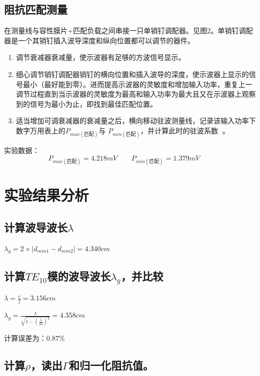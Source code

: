\documentclass{../source/Experiment}
\begin{document}
        \subsection{阻抗匹配测量}
        在测量线与容性膜片+匹配负载之间串接一只单销钉调配器。见图2。单销钉调配器是一个其销钉插入波导深度和纵向位置都可以调节的器件。
        \begin{enumerate}
            \item 调节衰减器衰减量，使示波器有足够的方波信号显示。
            \item 细心调节销钉调配器销钉的横向位置和插入波导的深度，使示波器上显示的信号最小（最好能到零）。进而提高示波器的灵敏度和增加输入功率，重复上一调节过程直到当示波器的灵敏度为最高和输入功率为最大且又在示波器上观察到的信号为最小为止，即找到最佳匹配位置。
            \item 适当增加可调衰减器的衰减量之后，横向移动驻波测量线，记录该输入功率下数字万用表上的$P_{max(\mbox{匹配})}$与 $P_{min(\mbox{匹配})}$，并计算此时的驻波系数 。
        \end{enumerate}
        实验数据：$$P_{max(\mbox{匹配})} = 4.218mV\qquad P_{min(\mbox{匹配})} = 1.379mV\qquad$$


    \section{实验结果分析}
        \subsection{计算波导波长$\lambda$}

        $\lambda_g = 2\times |d_{min1}-d_{min2}| = 4.340cm$

        \subsection{计算$TE_{10}$模的波导波长$\lambda_g$，并比较}


        $\lambda = \displaystyle \frac{c}{f} = 3.156cm$

        $\lambda_{g}= \displaystyle \frac{\lambda}{\sqrt{1-\left(\frac{\lambda}{2 a}\right)^{2}}} = 4.358cm$


        计算误差为：$0.87\% $

        \subsection{计算$\rho $，读出$\Gamma $和归一化阻抗值。}
\end{document}
